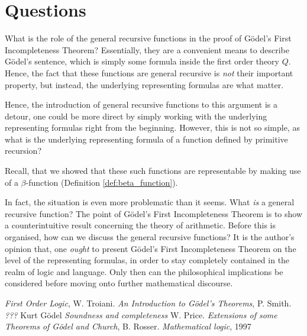 \documentclass[12pt]{article}
\theoremstyle{plain}
\theoremstyle{definition}
\begin{document}
	\section{Questions}
	What is the role of the general recursive functions in the proof of G\"{o}del's First Incompleteness Theorem? Essentially, they are a convenient means to describe G\"{o}del's sentence, which is simply some formula inside the first order theory $Q$. Hence, the fact that these functions are general recursive is \emph{not} their important property, but instead, the underlying representing formulas are what matter.
	
	Hence, the introduction of general recursive functions to this argument is a detour, one could be more direct by simply working with the underlying representing formulas right from the beginning. However, this is not so simple, as what is the underlying representing formula of a function defined by primitive recursion?
	
	Recall, that we showed that these such functions are representable by making use of a $\beta$-function (Definition \ref{def:beta_function}).
	
	In fact, the situation is even more problematic than it seems. What \emph{is} a general recursive function? The point of G\"{o}del's First Incompleteness Theorem is to show a counterintuitive result concerning the theory of arithmetic. Before this is organised, how can we discuss the general recursive functions? It is the author's opinion that, one \emph{ought} to present G\"{o}del's First Incompleteness Theorem on the level of the representing formulas, in order to stay completely contained in the realm of logic and language. Only then can the philosophical implications be considered before moving onto further mathematical discourse.
	
	
	\begin{thebibliography}{9}
		 \emph{First Order Logic}, W. Troiani.
		 \emph{An Introduction to G\"{o}del's Theorems}, P. Smith.
		 \emph{???} Kurt G\"{o}del
		 \emph{Soundness and completeness} W. Price.
		 \emph{Extensions of some Theorems of G\"{o}del and Church}, B. Rosser.
		 \emph{Mathematical logic}, 1997
	\end{thebibliography}
	
	
	
	
	
	
	
\end{document}
